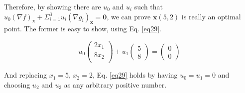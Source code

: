 Therefore, by showing there are $u_0$ and $u_i$ such that $u_0(\nabla f)_\mathbf{x} + \Sigma_{i=1}^{3} u_i (\nabla g_i)_\mathbf{x} = \mathbf{0}$, we can prove $\mathbf{x}(5,2)$ is really an optimal point. The former is easy to show, using Eq. \ref{eq29}.

\begin{equation}
u_0 \begin{pmatrix} 2x_1\\ 8x_2\\ \end{pmatrix} + u_1 \begin{pmatrix} 5\\ 8\end{pmatrix} = \begin{pmatrix}
0 \\ 0 \end{pmatrix}
\label{eq29}
\end{equation}

And replacing $x_1 = 5$, $x_2 = 2$, Eq. \ref{eq29} holds by having $u_0 = u_1 = 0$ and choosing $u_2$ and $u_3$ as any arbitrary positive number.
